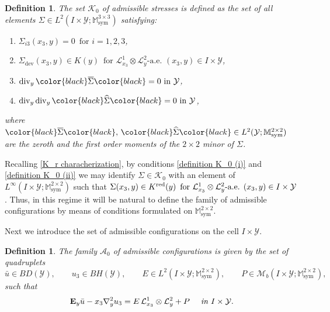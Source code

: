 \documentclass[reqno,10pt]{amsart}
\numberwithin{equation}{section}
\newtheorem{definition}[theorem]{Definition}
\theoremstyle{remark}
\newcommand{\BLACK}{\color{black}}
\newcommand{\PINK}{\color{black}}
\newcommand{\calA}{\mathcal{A}}
\newcommand{\calK}{\mathcal{K}}
\newcommand{\calL}{\mathcal{L}}
\newcommand{\M}{\mathbb{M}}
\newcommand{\calY}{\mathcal{Y}}
\DeclareMathOperator{\dev}{dev}
\DeclareMathOperator{\sym}{sym}
\renewcommand{\div}{\operatorname{div}}
\newcommand{\zerothI}[1]{\overline{#1}}
\newcommand{\firstI}[1]{\widehat{#1}}
\newcommand{\Mb}{\mathcal{M}_b}
\newcommand{\E}{{\bf E}}
\newcommand{\D}{\nabla}
\newcommand{\red}[1]{#1^{\rm red}}
\begin{document}
\begin{definition} \label{definition K_0}
The set $\calK_{0}$ of admissible stresses is defined as the set of all elements $\Sigma \in L^2(I \times \calY;\M^{3 \times 3}_{\sym})$ satisfying:
\begin{enumerate}[label=(\roman*)]
	\item \label{definition K_0 (i)} $\Sigma_{i3}(x_3,y) = 0 \,\text{ for } i=1,2,3$,
	\item \label{definition K_0 (ii)} $\Sigma_{\dev}(x_3,y) \in K(y) \,\text{ for } \calL^{1}_{x_3} \otimes \calL^{2}_{y}\text{-a.e. } (x_3,y) \in I \times \calY$,
	\item \label{definition K_0 (iii)} $\div_{y}{\PINK\zerothI{\Sigma}\BLACK} = 0 \text{ in } \calY$,
	\item \label{definition K_0 (iv)} $\div_{y}\div_{y}{\PINK\firstI{\Sigma}\BLACK} = 0 \text{ in } \calY$,
\end{enumerate}
where ${\PINK\zerothI{\Sigma}\BLACK},\, {\PINK\firstI{\Sigma}\BLACK} \in L^2(\calY;\M^{2 \times 2}_{\sym})$ are the zeroth and the first order moments of the $2 \times 2$ minor of $\Sigma$.
\end{definition}

Recalling \eqref{K_r characherization}, by conditions \ref{definition K_0 (i)} and \ref{definition K_0 (ii)} we may identify $\Sigma \in \calK_{0}$ with an element of $L^{\infty}(I \times \calY;\M^{2 \times 2}_{\sym})$ such that $\Sigma(x_3,y) \in \red{K}(y) \,\text{ for } \calL^{1}_{x_3} \otimes \calL^{2}_{y}\text{-a.e. } (x_3,y) \in I \times \calY$.
Thus, in this regime it will be natural to define the family of admissible configurations by means of conditions formulated on $\M^{2 \times 2}_{\sym}$.

Next we introduce the set of admissible configurations on the cell $I \times \calY$.

\begin{definition} \label{definition A_0}
The family $\calA_{0}$ of admissible configurations is given by the set of quadruplets
\begin{equation*}
	\bar{u} \in BD(\calY), \qquad u_3 \in BH(\calY), \qquad E \in L^2(I \times \calY;\M^{2 \times 2}_{\sym}), \qquad P \in \Mb(I \times \calY;\M^{2 \times 2}_{\sym}),
\end{equation*}
such that
\begin{equation} \label{disss1}
	{\E}_{y}\bar{u} - x_3 {\D}^2_{y}u_3 = E \,\calL^{1}_{x_3} \otimes \calL^{2}_{y} + P \quad \textit{ in } I \times \calY.
\end{equation}
\end{definition}
\end{document}
